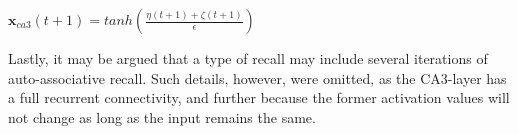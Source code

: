 \begin{center}
\begin{math}
    \textbf{x}_{ca3}(t+1) = tanh(\frac{\eta(t+1) + \zeta(t+1)}{\epsilon})
\end{math}
\end{center}

Lastly, it may be argued that a type of recall may include several iterations of auto-associative recall. Such details, however, were omitted, as the CA3-layer has a full recurrent connectivity, and further because the former activation values will not change as long as the input remains the same.














\cleardoublepage